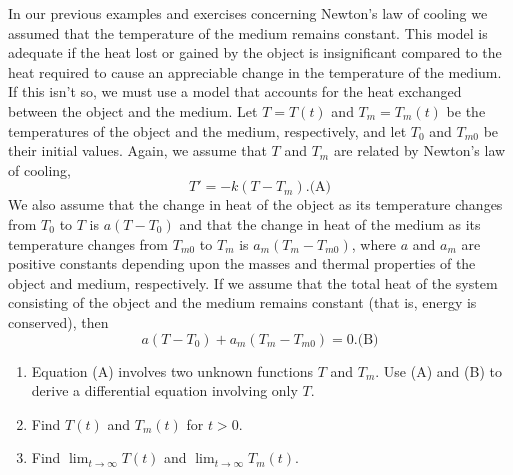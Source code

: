 \documentclass{ximera}
\begin{document}
\begin{problem}\label{exer:4.2.17}  %
In  our previous examples and exercises concerning Newton's law of cooling
we assumed that
the temperature of the medium remains constant.  This model is adequate
if the heat lost or gained by the object is
insignificant compared to the heat required to cause an appreciable change
in the temperature of the medium. If this isn't  so,  we
must use a model that accounts for the heat exchanged between the object
and the medium. Let $T=T(t)$ and $T_m=T_m(t)$  be the temperatures of the
object and the medium, respectively, and let $T_0$  and $T_{m0}$ be
their
initial values.  Again, we assume that $T$  and $T_m$ are related by
Newton's law of cooling,
$$
T'=-k(T-T_m).
\text{(A)}
$$
We also assume that the change in heat of the object as its
temperature changes from $T_0$ to $T$  is $a(T-T_0)$
and that the change in heat of the medium  as its
temperature changes from $T_{m0}$ to $T_m$  is $a_m(T_m-T_{m0})$,
where $a$
and $a_m$ are positive constants  depending  upon the masses and
thermal properties of the
object and medium, respectively.  If we assume that the total heat of
the system consisting of the object and the medium remains constant
(that is, energy is conserved), then
$$
a(T-T_0)+a_m(T_m-T_{m0})=0.
\text{(B)}
$$

\begin{enumerate}
\item %
Equation (A) involves  two unknown functions $T$ and $T_m$.
 Use (A) and (B) to derive a
differential equation involving only $T$.
\item %
Find $T(t)$ and $T_m(t)$ for $t>0$.
\item %
Find $\lim_{t\to\infty}T(t)$ and
 $\lim_{t\to\infty}T_m(t)$.
\end{enumerate}
\end{problem}
\end{document}
